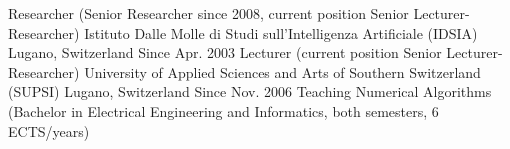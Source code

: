 \begin{cventries}
\cventry
{Researcher (Senior Researcher since 2008, current position Senior Lecturer-Researcher)}
{Istituto Dalle Molle di Studi sull'Intelligenza Artificiale (IDSIA)}
{Lugano, Switzerland}
{Since Apr. 2003}
{}
\cventry
{Lecturer (current position Senior Lecturer-Researcher)}
{University of Applied Sciences and Arts of Southern Switzerland (SUPSI)}
{Lugano, Switzerland}
{Since Nov. 2006}
{Teaching Numerical Algorithms (Bachelor in Electrical Engineering and Informatics, both semesters, 6 ECTS/years)}
\end{cventries}
